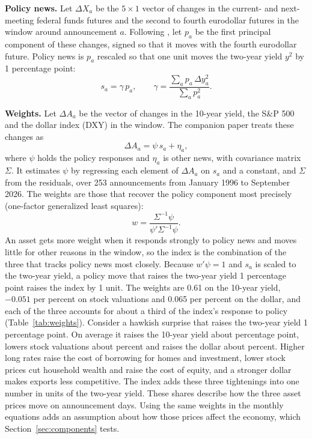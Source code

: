 \documentclass[11pt]{article}
\begin{document}
\textbf{Policy news.} Let $\Delta X_a$ be the $5\times 1$ vector of changes in the current- and next-meeting federal funds futures and the second to fourth eurodollar futures in the window around announcement $a$. Following \citet{nakamura2018}, let $p_a$ be the first principal component of these changes, signed so that it moves with the fourth eurodollar future. Policy news is $p_a$ rescaled so that one unit moves the two-year yield $y^{2}$ by 1 percentage point:
\begin{equation}
s_a = \gamma\, p_a, \qquad \gamma = \frac{\sum_a p_a\, \Delta y^{2}_a}{\sum_a p_a^{2}}. \label{eq:ns}
\end{equation}

\textbf{Weights.} Let $\Delta A_a$ be the vector of changes in the 10-year yield, the S\&P 500 and the dollar index (DXY) in the window. The companion paper treats these changes as
\begin{equation}
\Delta A_a = \psi\, s_a + \eta_a, \label{eq:window}
\end{equation}
where $\psi$ holds the policy responses and $\eta_a$ is other news, with covariance matrix $\Sigma$. It estimates $\psi$ by regressing each element of $\Delta A_a$ on $s_a$ and a constant, and $\Sigma$ from the residuals, over 253 announcements from January 1996 to September 2026. The weights are those that recover the policy component most precisely (one-factor generalized least squares):
\begin{equation}
w = \frac{\Sigma^{-1}\psi}{\psi'\Sigma^{-1}\psi}. \label{eq:weights}
\end{equation}
An asset gets more weight when it responds strongly to policy news and moves little for other reasons in the window, so the index is the combination of the three that tracks policy news most closely. Because $w'\psi=1$ and $s_a$ is scaled to the two-year yield, a policy move that raises the two-year yield 1 percentage point raises the index by 1 unit. The weights are 0.61 on the 10-year yield, $-0.051$ per percent on stock valuations and 0.065 per percent on the dollar, and each of the three accounts for about a third of the index's response to policy (Table~\ref{tab:weights}). Consider a hawkish surprise that raises the two-year yield 1 percentage point. On average it raises the 10-year yield about  percentage point, lowers stock valuations about  percent and raises the dollar about  percent. Higher long rates raise the cost of borrowing for homes and investment, lower stock prices cut household wealth and raise the cost of equity, and a stronger dollar makes exports less competitive. The index adds these three tightenings into one number in units of the two-year yield. These shares describe how the three asset prices move on announcement days. Using the same weights in the monthly equations adds an assumption about how those prices affect the economy, which Section~\ref{sec:components} tests.
\end{document}
